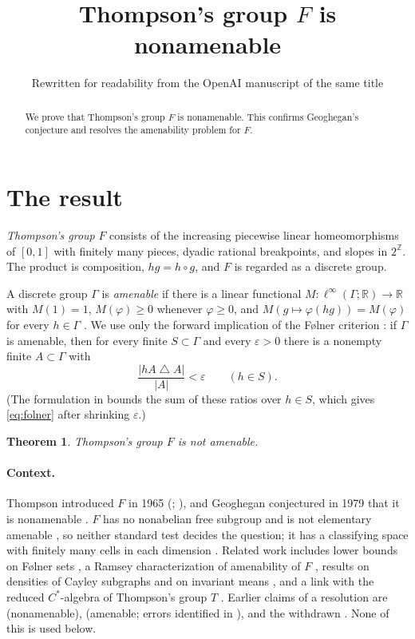 \documentclass[11pt]{article}
\title{Thompson's group \(F\) is nonamenable}
\author{Rewritten for readability from the OpenAI manuscript of the same title}
\date{}
\newcommand{\R}{\mathbb R}
\newcommand{\Z}{\mathbb Z}
\newtheorem{theorem}{Theorem}[section]
\theoremstyle{definition}
\numberwithin{equation}{section}
\begin{document}
\maketitle
\begin{abstract}
We prove that Thompson's group \(F\) is nonamenable. This confirms
Geoghegan's conjecture and resolves the amenability problem for \(F\).
\end{abstract}

\section{The result}\label{sec:introduction}

\emph{Thompson's group} $F$ consists of the increasing piecewise linear
homeomorphisms of $[0,1]$ with finitely many pieces, dyadic rational
breakpoints, and slopes in $2^{\Z}$. The product is composition,
$hg=h\circ g$, and $F$ is regarded as a discrete group.

A discrete group $\Gamma$ is \emph{amenable} if there is a linear functional
$M:\ell^\infty(\Gamma;\R)\to\R$ with $M(1)=1$, $M(\varphi)\ge0$ whenever
$\varphi\ge0$, and $M(g\mapsto\varphi(hg))=M(\varphi)$ for every
$h\in\Gamma$ \cite{vonNeumann1929,Day1957}. We use only the forward
implication of the F\o lner criterion \cite{Folner1955}: if $\Gamma$ is
amenable, then for every finite $S\subset\Gamma$ and every $\varepsilon>0$
there is a nonempty finite $A\subset\Gamma$ with
\begin{equation}\label{eq:folner}
  \frac{|hA\mathbin{\triangle}A|}{|A|}<\varepsilon\qquad(h\in S).
\end{equation}
(The formulation in \cite[Theorem~1.2]{Moore2013} bounds the sum of these
ratios over $h\in S$, which gives \eqref{eq:folner} after shrinking
$\varepsilon$.)

\begin{theorem}\label{thm:main}
Thompson's group \(F\) is not amenable.
\end{theorem}

\paragraph{Context.}
Thompson introduced $F$ in 1965 (\cite{McKenzieThompson1973};
\cite[pp.~215--216]{CannonFloydParry1996}), and Geoghegan conjectured in 1979
that it is nonamenable \cite[p.~227]{CannonFloydParry1996}. $F$ has no
nonabelian free subgroup \cite[Theorem~3.1]{BrinSquier1985} and is not
elementary amenable \cite[Theorem~4.10]{CannonFloydParry1996}, so neither
standard test decides the question; it has a classifying space with
finitely many cells in each dimension \cite{BrownGeoghegan1984}. Related
work includes lower bounds on F\o lner sets
\cite[Theorem~1.1]{MooreFolner2013}, a Ramsey characterization of
amenability of $F$ \cite[Theorem~3.1]{Moore2013}, results on densities of
Cayley subgraphs and on invariant means \cite{Guba2025Density,Guba2026}, and
a link with the reduced $C^*$-algebra of Thompson's group $T$
\cite[Theorem~5.5]{HaagerupOlesen2017}. Earlier claims of a resolution are
\cite{Akhmedov2021} (nonamenable), \cite{Shavgulidze2009} (amenable; errors
identified in \cite{Moore2011Critique}), and the withdrawn
\cite{Moore2012Withdrawn}. None of this is used below.
\end{document}
